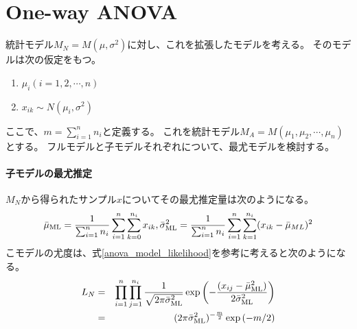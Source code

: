 \section{One-way ANOVA}
統計モデル$M_N= M (\mu,\sigma^2)$に対し、これを拡張したモデルを考える。
そのモデルは次の仮定をもつ。
\begin{enumerate}
    \item $\mu_i (i=1,2,\cdots,n)$
    \item $x_{ik} \sim N(\mu_i,\sigma^2)$
\end{enumerate}
ここで、$m=\sum_{i=1}^n n_i$と定義する。
これを統計モデル$M_A=M(\mu_1,\mu_2,\cdots,\mu_n)$とする。
フルモデルと子モデルそれぞれについて、最尤モデルを検討する。

\paragraph{子モデルの最尤推定}
$M_N$から得られたサンプル$x$についてその最尤推定量は次のようになる。
\begin{equation*}
    \bar{\mu}_{\rm{ML}} = \frac{1}{\sum_{i=1}^n n_i} \sum_{i=1}^n\sum_{k=0}^{n_i} x_{ik}, \\
    \bar{\sigma}_{\rm{ML}}^2 =  \frac{1}{\sum_{i=1}^n n_i} \sum_{i=1}^n \sum_{k=1}^{n_i}(x_{ik} -\bar{\mu}_{ML})^2
\end{equation*}
こモデルの尤度は、式\ref{anova_model_likelihood}を参考に考えると次のようになる。
\begin{eqnarray*}
 L_N&=& \prod_{i=1}^n \prod_{j=1}^{n_i}\frac{1}{\sqrt{2\pi \bar{\sigma}^2_{\rm{ML}}}}\exp\left(  -\frac{(x_{ij}-\bar{\mu}_{\rm{ML}}^2)}{2 \bar{\sigma}^2_{\rm{ML}}}\right) \\
&=&  (2\pi \bar{\sigma}^2_{\rm{ML}})^{-\frac{m}{2} }\exp\left(  -m/2\right) 
\end{eqnarray*}

